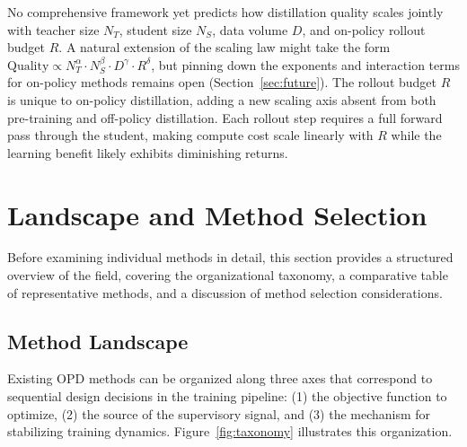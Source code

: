 \documentclass{article} %
\begin{document}
No comprehensive framework yet predicts how distillation quality scales jointly with teacher size $N_T$, student size $N_S$, data volume $D$, and on-policy rollout budget $R$. A natural extension of the \citet{2502.08606} scaling law might take the form $\text{Quality} \propto N_T^\alpha \cdot N_S^\beta \cdot D^\gamma \cdot R^\delta$, but pinning down the exponents and interaction terms for on-policy methods remains open (Section~\ref{sec:future}). The rollout budget $R$ is unique to on-policy distillation, adding a new scaling axis absent from both pre-training and off-policy distillation. Each rollout step requires a full forward pass through the student, making compute cost scale linearly with $R$ while the learning benefit likely exhibits diminishing returns.

\section{Landscape and Method Selection}
\label{sec:landscape}

Before examining individual methods in detail, this section provides a structured overview of the field, covering the organizational taxonomy, a comparative table of representative methods, and a discussion of method selection considerations.

\subsection{Method Landscape}

Existing OPD methods can be organized along three axes that correspond to sequential design decisions in the training pipeline: (1) the objective function to optimize, (2) the source of the supervisory signal, and (3) the mechanism for stabilizing training dynamics. Figure~\ref{fig:taxonomy} illustrates this organization.
\end{document}

